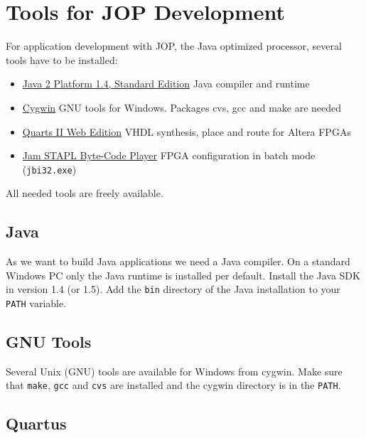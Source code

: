 \documentclass[a4paper,12pt]{scrartcl}
\newcommand{\code}[1]{{\texttt{#1}}}
\newcommand{\cmd}[1]{{\texttt{#1}}}
\newcommand{\dirent}[1]{{\texttt{#1}}}
\begin{document}
\section*{Tools for JOP Development}



For application development with JOP, the Java optimized processor,
several tools have to be installed:

%
\begin{itemize}
    \item  \href{http://java.sun.com/j2se/1.4.2/download.html}%
{Java 2 Platform 1.4, Standard Edition}  Java compiler and runtime
    \item  \href{http://www.cygwin.com/}%
{Cygwin} GNU tools for Windows. Packages cvs, gcc and make are
needed
    \item  \href{https://www.altera.com/support/software/download/altera_design/quartus_we/dnl-quartus_we.jsp}%
{Quarts II Web Edition} VHDL synthesis, place and route for Altera
FPGAs
    \item  \href{https://www.altera.com/support/software/download/programming/jam/dnl-byte_code_player.jsp}%
{Jam STAPL Byte-Code Player} FPGA configuration in batch mode
(\cmd{jbi32.exe})

\end{itemize}
%
All needed tools are freely available.

\subsection*{Java}

As we want to build Java applications we need a Java compiler. On a
standard Windows PC only the Java runtime is installed per default.
Install the Java SDK in version 1.4 (or 1.5).
Add the \dirent{bin} directory of the Java installation to
your \dirent{PATH} variable.

\subsection*{GNU Tools}

Several Unix (GNU) tools are available for Windows from cygwin. Make
sure that \code{make}, \code{gcc} and \code{cvs} are installed and
the cygwin directory is in the \dirent{PATH}.

\subsection*{Quartus}
\end{document}
